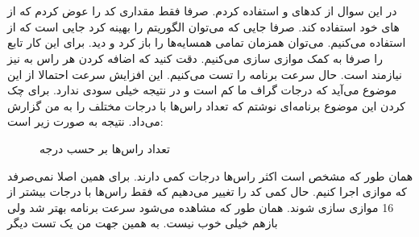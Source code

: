 \section{}
در این سوال از کد‌های
و
استفاده کردم. صرفا فقط مقداری کد
را عوض کردم که از
های
خود
استفاده کند. صرفا جایی که می‌توان الگوریتم را بهینه کرد جایی است که از
استفاده می‌کنیم. می‌توان همزمان تمامی همسایه‌ها را باز کرد و دید. برای این کار تابع
را صرفا به کمک
موازی سازی می‌کنیم. دقت کنید که اضافه کردن هر راس به
نیز نیازمند
است. حال سرعت برنامه را تست می‌کنیم.
این افزایش سرعت احتمالا از این موضوع می‌آید که درجات گراف ما کم است و در نتیجه
خیلی سودی ندارد. برای چک کردن این موضوع برنامه‌ای نوشتم که تعداد راس‌ها با درجات مختلف را به من گزارش
می‌داد. نتیجه به صورت زیر است:
\begin{figure}[H]
    \centering
    \caption{تعداد راس‌ها بر حسب درجه}
\end{figure}
همان طور که مشخص است اکثر راس‌ها درجات کمی دارند. برای همین اصلا نمی‌صرفد که موازی اجرا کنیم.
حال کمی کد را تغییر می‌دهیم که فقط راس‌ها با درجات بیشتر از 16 موازی سازی شوند.
همان طور که مشاهده می‌شود سرعت برنامه بهتر شد ولی باز‌هم خیلی خوب نیست. به همین جهت من یک تست دیگر
